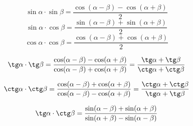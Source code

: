 \documentclass[onecolumn, a4paper, 12pt, BCOR=1mm, DIV=12]{scrreprt}
\begin{document}
      $$ \sin\alpha \cdot \sin\beta = \dfrac{\cos(\alpha - \beta)-\cos(\alpha + \beta)}{2} $$
      $$ \sin\alpha \cdot \cos\beta = \dfrac{\sin(\alpha - \beta)+\sin(\alpha + \beta)}{2} $$
      $$ \cos\alpha \cdot \cos\beta = \dfrac{\cos(\alpha - \beta)+\cos(\alpha + \beta)}{2} $$


      $$\tg\alpha \cdot \tg\beta = \dfrac{\cos(\alpha - \beta)-\cos(\alpha + \beta)}{\cos(\alpha - \beta)+\cos(\alpha + \beta)} = \frac{\tg\alpha + \tg\beta}{\ctg\alpha + \ctg\beta} $$

      $$\ctg\alpha \cdot \ctg\beta = \dfrac{\cos(\alpha - \beta)+\cos(\alpha + \beta)}{\cos(\alpha - \beta)-\cos(\alpha + \beta)} = \frac{\ctg\alpha + \ctg\beta}{\tg\alpha + \tg\beta}$$

      $$\tg\alpha \cdot \ctg\beta = \dfrac{\sin(\alpha - \beta)+\sin(\alpha + \beta)}{\sin(\alpha + \beta)-\sin(\alpha - \beta)}$$
\end{document}
